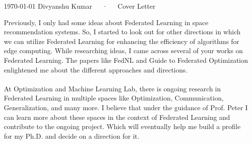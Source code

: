 \documentclass[11pt, a4paper]{awesome-cv}
\begin{document}
\makecvheader

\makecvfooter
  {\today}
  {Divyanshu Kumar~~~·~~~Cover Letter}
  {}

\makelettertitle

\begin{cvletter}

Previously, I only had some ideas about Federated Learning in space recommendation systems. So, I started to look out for other directions in which we can utilize Federated Learning for enhancing the efficiency of algorithms for edge computing. While researching ideas, I came across several of your works on Federated Learning. The papers like FedNL and Guide to Federated Optimization enlightened me about the different approaches and directions. \\
\\
At Optimization and Machine Learning Lab, there is ongoing research in Federated Learning in multiple spaces like Optimization,
Communication, Generalization, and many more. I believe that under the guidance of Prof. Peter
I can learn more about these spaces in the context of Federated Learning and contribute
to the ongoing project. Which will eventually help me build a profile for my Ph.D. and
decide on a direction for it.



\end{cvletter}


\end{document}
